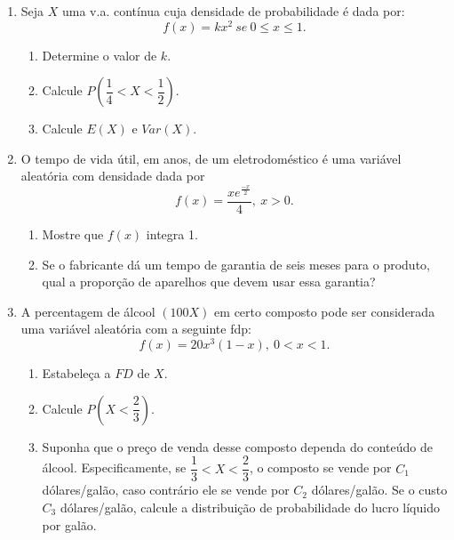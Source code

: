 \begin{enumerate}
\item Seja $X$ uma v.a. contínua cuja densidade de probabilidade é dada por:
	\begin{equation*}
		f(x)=kx^{2}\ se\ 0\leq x \leq 1.
	\end{equation*}
	
	\begin{enumerate}[label=\alph*)]
		\item Determine o valor de $k$.
		\item Calcule $P(\dfrac{1}{4}< X < \dfrac{1}{2})$.
		\item Calcule $E(X)$ e $Var(X)$.
	\end{enumerate}
	
\item O tempo de vida útil, em anos, de um eletrodoméstico é uma variável aleatória com densidade dada por
	\begin{equation*}
		f(x)=\dfrac{xe^{\frac{-x}{2}}}{4},\ x>0.
	\end{equation*}
	
	\begin{enumerate}[label=\alph*)]
		\item Mostre que $f(x)$ integra 1.
		\item Se o fabricante dá um tempo de garantia de seis meses para o produto, qual a proporção de aparelhos que devem usar essa garantia?
	\end{enumerate}
\setcounter{enumi}{3}
\item A percentagem de álcool $(100X)$ em certo composto pode ser considerada uma variável aleatória com a seguinte fdp:
	\begin{equation*}
		f(x) = 20x^{3}(1-x),\ 0 < x < 1.
	\end{equation*}

	\begin{enumerate}[label=\alph*)]
		\item Estabeleça a $FD$ de $X$.
		\item Calcule $P(X < \dfrac{2}{3})$.
		\item Suponha que o preço de venda desse composto dependa do conteúdo de álcool. Especificamente, se $\dfrac{1}{3} < X < \dfrac{2}{3}$, o composto se vende por $C_{1}$ dólares/galão, caso contrário ele se vende por $C_{2}$ dólares/galão. Se o custo $C_{3}$ dólares/galão, calcule a distribuição de probabilidade do lucro líquido por galão.
	\end{enumerate}
\end{enumerate}

